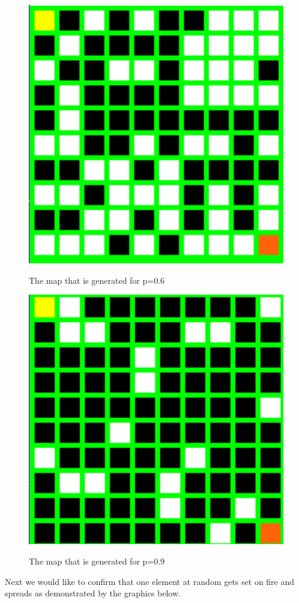 \documentclass[11pt]{scrartcl} %
\begin{document}
	\begin{figure}[H]
 	\begin{center}
	\includegraphics*[scale=0.3]{GUI4C.png}
	\caption{The map that is generated for p=0.6}
	\label{fig:example}
	\vspace{2em}
	\includegraphics*[scale=0.3]{GUI5C.png}
	\caption{The map that is generated for p=0.9}
	\label{fig:example}
	\end{center}
	\end{figure}
\pagebreak
Next we would like to confirm that one element at random gets set on fire and spreads as demonstrated by the graphics below. \\
\end{document}
